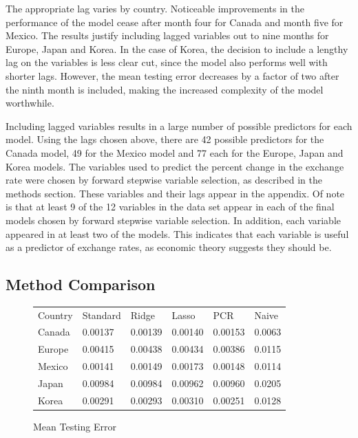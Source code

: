 \documentclass{sig-alternate-05-2015}
\begin{document}
\par{} The appropriate lag varies by country. Noticeable improvements in the performance of the model cease after month four for Canada and month five for Mexico. The results justify including lagged variables out to nine months for Europe, Japan and Korea. In the case of Korea, the decision to include a lengthy lag on the variables is less clear cut, since the model also performs well with shorter lags. However, the mean testing error decreases by a factor of two after the ninth month is included, making the increased complexity of the model worthwhile.
\par{} Including lagged variables results in a large number of possible predictors for each model. Using the lags chosen above, there are 42 possible predictors for the Canada model, 49 for the Mexico model and 77 each for the Europe, Japan and Korea models. The variables used to predict the percent change in the exchange rate were chosen by forward stepwise variable selection, as described in the methods section. These variables and their lags appear in the appendix. Of note is that at least 9 of the 12 variables in the data set appear in each of the final models chosen by forward stepwise variable selection. In addition, each variable appeared in at least two of the models. This indicates that each variable is useful as a predictor of exchange rates, as economic theory suggests they should be.

\subsection{Method Comparison}

\begin{figure}
\centering
\caption{Mean Testing Error}
\begin{tabular}{l l l l l l}
Country	& Standard 	& Ridge 		& Lasso 		& PCR 		& Naive \\
Canada 	& 0.00137 	& 0.00139 	& 0.00140 	& 0.00153 	& 0.0063 \\
Europe	& 0.00415 	& 0.00438 	& 0.00434 	& 0.00386 	& 0.0115 \\
Mexico	& 0.00141 	& 0.00149 	& 0.00173 	& 0.00148  & 0.0114 \\
Japan	& 0.00984 	& 0.00984 	& 0.00962 	& 0.00960  & 0.0205 \\
Korea	& 0.00291 	& 0.00293 	& 0.00310 	& 0.00251 	& 0.0128 \\
\end{tabular}
\label{tab:comparison}
\end{figure}
\end{document}
